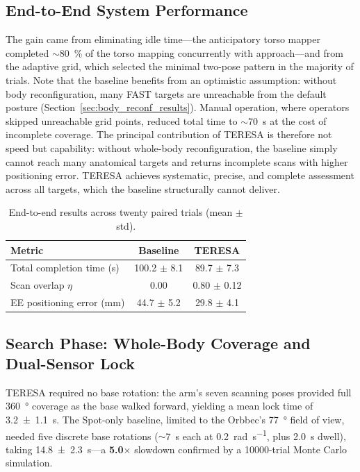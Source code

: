 \subsection{End-to-End System Performance}
 The gain
came from eliminating idle time---the anticipatory torso mapper completed
$\sim$\SI{80}{\percent} of the torso mapping concurrently with approach---and from the adaptive grid, which selected the minimal two-pose pattern in the
majority of trials.  Note that the baseline benefits from an optimistic
assumption: without body reconfiguration, many \ac{FAST} targets are
unreachable from the default posture
(Section~\ref{sec:body_reconf_results}).  Manual operation, where
operators skipped unreachable grid points, reduced total time to
$\sim$\SI{70}{\second} at the cost of incomplete coverage.  The principal
contribution of \ac{TERESA} is therefore not speed but capability: without
whole-body reconfiguration, the baseline simply cannot reach many anatomical
targets and returns incomplete scans with higher positioning error.
\ac{TERESA} achieves systematic, precise, and complete assessment across all
targets, which the baseline structurally cannot deliver.
\begin{table}[h!]
  \centering
  \caption{End-to-end results across twenty paired trials (mean $\pm$ std).}
  \label{tab:endtoend}
  \begin{tabular}{lcc}
    \toprule
    Metric & Baseline & \ac{TERESA} \\
    \midrule
    Total completion time (s) & 100.2 $\pm$ 8.1 & 89.7 $\pm$ 7.3 \\
    Scan overlap $\eta$ & 0.00 & 0.80 $\pm$ 0.12 \\
    \ac{EE} positioning error (mm) & 44.7 $\pm$ 5.2 & 29.8 $\pm$ 4.1 \\
    \bottomrule
  \end{tabular}
\end{table}

\subsection{Search Phase: Whole-Body Coverage and Dual-Sensor Lock}
\ac{TERESA} required no base rotation: the arm's seven scanning poses
provided full \SI{360}{\degree} coverage as the base walked forward,
yielding a mean lock time of \SI{3.2 \pm 1.1}{\second}. The Spot-only
baseline, limited to the Orbbec's \SI{77}{\degree} field of view, needed five
discrete base rotations ($\sim$\SI{7}{\second} each at
\SI{0.2}{\radian\per\second}, plus \SI{2.0}{\second} dwell), taking
\SI{14.8 \pm 2.3}{\second}---a \textbf{5.0}$\times$ slowdown confirmed by a
\num{10000}-trial Monte Carlo simulation.

